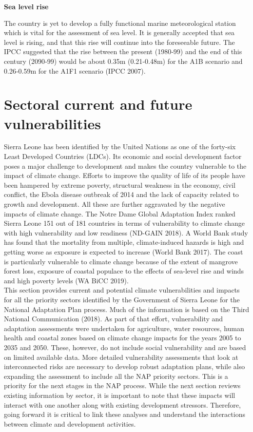 \documentclass[
]{book}
\begin{document}
\textbf{Sea level rise}

The country is yet to develop a fully functional marine meteorological station which is vital for the assessment of sea level. It is generally accepted that sea level is rising, and that this rise will continue into the foreseeable future.
The IPCC suggested that the rise between the present (1980‐99) and the end of this century (2090‐99) would be about 0.35m (0.21‐0.48m) for the A1B scenario and 0.26‐0.59m for the A1F1 scenario (IPCC 2007).

\hypertarget{sectoral-current-and-future-vulnerabilities}{%
\section{Sectoral current and future vulnerabilities}\label{sectoral-current-and-future-vulnerabilities}}

Sierra Leone has been identified by the United Nations as one of the forty-six Least Developed Countries (LDCs). Its economic and social development factor poses a major challenge to development and makes the country vulnerable to the impact of climate change. Efforts to improve the quality of life of its people have been hampered by extreme poverty, structural weakness in the economy, civil conflict, the Ebola disease outbreak of 2014 and the lack of capacity related to growth and development. All these are further aggravated by the negative impacts of climate change. The Notre Dame Global Adaptation Index ranked Sierra Leone 151 out of 181 countries in terms of vulnerability to climate change with high vulnerability and low readiness (ND-GAIN 2018). A World Bank study has found that the mortality from multiple, climate-induced hazards is high and getting worse as exposure is expected to increase (World Bank 2017). The coast is particularly vulnerable to climate change because of the extent of mangrove forest loss, exposure of coastal populace to the effects of sea-level rise and winds and high poverty levels (WA BiCC 2019).\\
This section provides current and potential climate vulnerabilities and impacts for all the priority sectors identified by the Government of Sierra Leone for the National Adaptation Plan process. Much of the information is based on the Third National Communication (2018). As part of that effort, vulnerability and adaptation assessments were undertaken for agriculture, water resources, human health and coastal zones based on climate change impacts for the years 2005 to 2035 and 2050. These, however, do not include social vulnerability and are based on limited available data. More detailed vulnerability assessments that look at interconnected risks are necessary to develop robust adaptation plans, while also expanding the assessment to include all the NAP priority sectors. This is a priority for the next stages in the NAP process. While the next section reviews existing information by sector, it is important to note that these impacts will interact with one another along with existing development stressors. Therefore, going forward it is critical to link these analyses and understand the interactions between climate and development activities.
\end{document}
